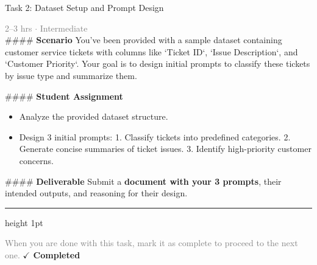 \documentclass[10pt,a4paper]{article}
\begin{document}
\begin{taskbox}{Task 2: Dataset Setup and Prompt Design}

    {\small \textcolor{gray}{2--3 hrs $\cdot$ Intermediate}}\\[12pt]

    \#\#\#\# \textbf{Scenario}
You’ve been provided with a sample dataset containing customer service tickets with columns like `Ticket ID`, `Issue Description`, and `Customer Priority`. Your goal is to design initial prompts to classify these tickets by issue type and summarize them.

\#\#\#\# \textbf{Student Assignment}
\begin{itemize}
    \item Analyze the provided dataset structure.
    \item Design 3 initial prompts:
  1. Classify tickets into predefined categories.
  2. Generate concise summaries of ticket issues.
  3. Identify high-priority customer concerns.
\end{itemize}
  
\#\#\#\# \textbf{Deliverable}
Submit a \textbf{document with your 3 prompts}, their intended outputs, and reasoning for their design.\par

    \vspace{16pt}

    \textcolor{cardBorder}{\hrule height 1pt}\vspace{8pt}

    \small \textcolor{gray}{When you are done with this task, mark it as complete to proceed to the next one.} \hfill \textbf{\textcolor{brandDark}{$\checkmark$ Completed}}

\end{taskbox}
\end{document}

